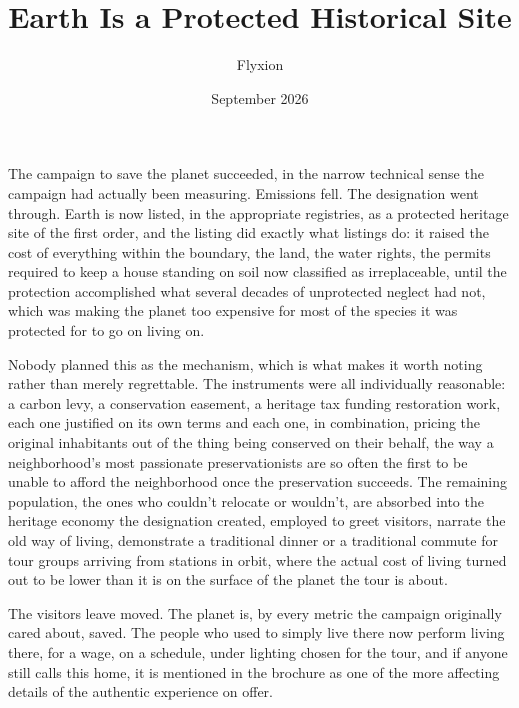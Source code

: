 \documentclass[11pt]{article}
\title{Earth Is a Protected Historical Site}
\author{Flyxion}
\date{September 2026}
\begin{document}
\maketitle

The campaign to save the planet succeeded, in the narrow technical sense the campaign had actually been measuring. Emissions fell. The designation went through. Earth is now listed, in the appropriate registries, as a protected heritage site of the first order, and the listing did exactly what listings do: it raised the cost of everything within the boundary, the land, the water rights, the permits required to keep a house standing on soil now classified as irreplaceable, until the protection accomplished what several decades of unprotected neglect had not, which was making the planet too expensive for most of the species it was protected for to go on living on.

Nobody planned this as the mechanism, which is what makes it worth noting rather than merely regrettable. The instruments were all individually reasonable: a carbon levy, a conservation easement, a heritage tax funding restoration work, each one justified on its own terms and each one, in combination, pricing the original inhabitants out of the thing being conserved on their behalf, the way a neighborhood's most passionate preservationists are so often the first to be unable to afford the neighborhood once the preservation succeeds. The remaining population, the ones who couldn't relocate or wouldn't, are absorbed into the heritage economy the designation created, employed to greet visitors, narrate the old way of living, demonstrate a traditional dinner or a traditional commute for tour groups arriving from stations in orbit, where the actual cost of living turned out to be lower than it is on the surface of the planet the tour is about.

The visitors leave moved. The planet is, by every metric the campaign originally cared about, saved. The people who used to simply live there now perform living there, for a wage, on a schedule, under lighting chosen for the tour, and if anyone still calls this home, it is mentioned in the brochure as one of the more affecting details of the authentic experience on offer.
\end{document}
